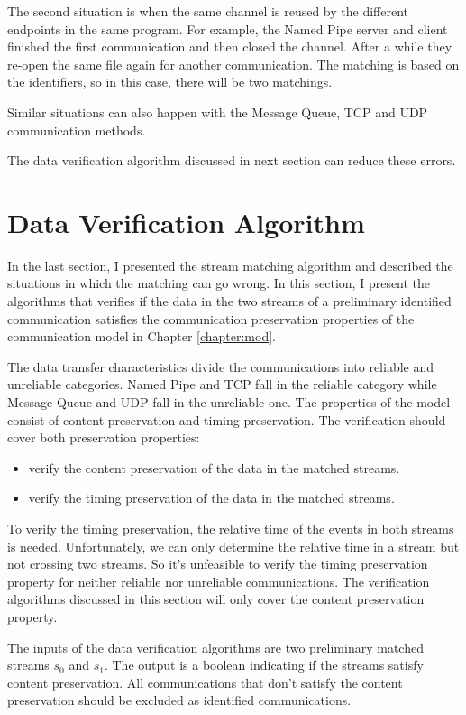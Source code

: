 \documentclass[12pt,oneside]{book}
\begin{document}
The second situation is when the same channel is reused by the different endpoints in the same program. For example, the Named Pipe server and client finished the first communication and then closed the channel. After a while they re-open the same file again for another communication. The matching is based on the identifiers, so in this case, there will be two matchings.

Similar situations can also happen with the Message Queue, TCP and UDP communication methods. 

The data verification algorithm discussed in next section can reduce these errors. 

\section{Data Verification Algorithm}\label{verfication}
In the last section, I presented the stream matching algorithm and described the situations in which the matching can go wrong. In this section, I present the algorithms that verifies if the data in the two streams of a preliminary identified communication satisfies the communication preservation properties of the communication model in Chapter \ref{chapter:mod}. 

The data transfer characteristics divide the communications into reliable and unreliable categories. Named Pipe and TCP fall in the reliable category while Message Queue and UDP fall in the unreliable one. The properties of the model consist of content preservation and timing preservation. The verification should cover both preservation properties: 
\begin{itemize}
\item verify the content preservation of the data in the matched streams. 
\item verify the timing preservation of the data in the matched streams. 
\end{itemize}

To verify the timing preservation, the relative time of the events in both streams is needed. Unfortunately, we can only determine the relative time in a stream but not crossing two streams. So it's unfeasible to verify the timing preservation property for neither reliable nor unreliable communications. The verification algorithms discussed in this section will only cover the content preservation property.  

The inputs of the data verification algorithms are two preliminary matched streams $s_0$ and $s_1$. The output is a boolean indicating if the streams satisfy content preservation. All communications that don't satisfy the content preservation should be excluded as identified communications.
\end{document}
